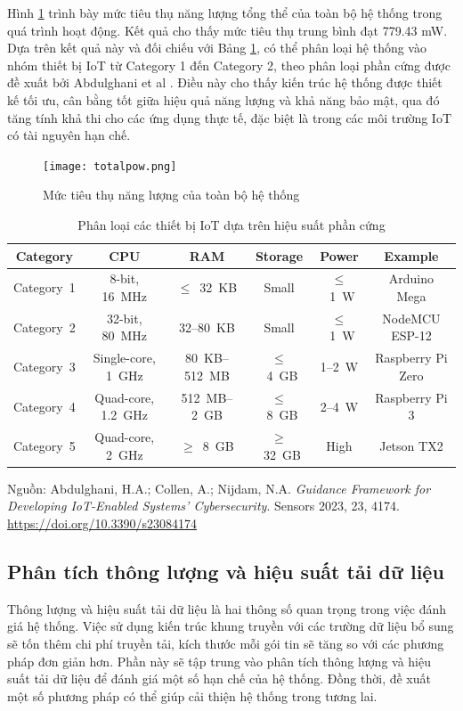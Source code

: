 Hình \ref{fig:totalpow} trình bày mức tiêu thụ năng lượng tổng thể của toàn bộ hệ thống trong quá trình hoạt động. Kết quả cho thấy mức tiêu thụ trung bình đạt 779.43 mW.
Dựa trên kết quả này và đối chiếu với Bảng \ref{tab:hardware}, có thể phân loại hệ thống vào nhóm thiết bị IoT từ Category 1 đến Category 2, theo phân loại phần cứng được đề xuất bởi Abdulghani et al \cite{hardware}.
Điều này cho thấy kiến trúc hệ thống được thiết kế tối ưu, cân bằng tốt giữa hiệu quả năng lượng và khả năng bảo mật, qua đó tăng tính khả thi cho các ứng dụng thực tế, đặc biệt là trong các môi trường IoT có tài nguyên hạn chế.
\begin{figure}[H]
    \centering
    \texttt{[image: totalpow.png]}
    \caption{Mức tiêu thụ năng lượng của toàn bộ hệ thống}
    \label{fig:totalpow}
\end{figure}

\begin{table}[ht]
\centering
\small
\caption{Phân loại các thiết bị IoT dựa trên hiệu suất phần cứng}
\label{tab:hardware}
\begin{tabular}{|c|c|c|c|c|c|}
\hline
\textbf{Category} & \textbf{CPU} & \textbf{RAM} & \textbf{Storage} & \textbf{Power} & \textbf{Example} \\
\hline
Category~1 & 8-bit, 16~MHz & $\leq$~32~KB & Small & $\leq$~1~W & Arduino Mega \\
\hline
Category~2 & 32-bit, 80~MHz & 32--80~KB & Small & $\leq$~1~W & NodeMCU ESP-12 \\
\hline
Category~3 & Single-core, 1~GHz & 80~KB--512~MB & $\leq$~4~GB & 1--2~W & Raspberry Pi Zero \\
\hline
Category~4 & Quad-core, 1.2~GHz & 512~MB--2~GB & $\leq$~8~GB & 2--4~W & Raspberry Pi 3 \\
\hline
Category~5 & Quad-core, 2~GHz & $\geq$~8~GB & $\geq$~32~GB & High & Jetson TX2 \\
\hline
\end{tabular}
\begin{flushleft}
\footnotesize
Nguồn: Abdulghani, H.A.; Collen, A.; Nijdam, N.A. \textit{Guidance Framework for Developing IoT-Enabled Systems’ Cybersecurity}. Sensors 2023, 23, 4174. \url{https://doi.org/10.3390/s23084174}
\end{flushleft}
\end{table}

\subsection{Phân tích thông lượng và hiệu suất tải dữ liệu}
\label{sec:put}
Thông lượng và hiệu suất tải dữ liệu là hai thông số quan trọng trong việc đánh giá hệ thống. Việc sử dụng kiến trúc khung truyền với các trường dữ liệu bổ sung sẽ tốn thêm chi phí truyền tải, kích thước mỗi gói tin sẽ tăng so với các phương pháp đơn giản hơn. Phần này sẽ tập trung vào phân tích thông lượng và hiệu suất tải dữ liệu để đánh giá một số hạn chế của hệ thống. Đồng thời, đề xuất một số phương pháp có thể giúp cải thiện hệ thống trong tương lai.

